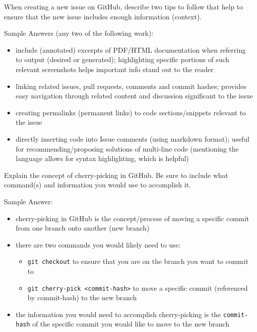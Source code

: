 \documentclass[12pt,fleqn]{examtst}
\begin{document}

\newpage
\noindent
\begin{minipage}{\textwidth}

When creating a new issue on GitHub, describe two tips to follow that help to ensure that the new issue includes enough information (context).


Sample Answers (any two of the following work):
\begin{itemize}
    \item include (annotated) excerpts of PDF/HTML documentation when referring to output (desired or generated); highlighting specific portions of such relevant screenshots helps important info stand out to the reader
    \item linking related issues, pull requests, comments and commit hashes; provides easy navigation through related content and discussion significant to the issue
    \item creating permalinks (permanent links) to code sections/snippets relevant to the issue
    \item directly inserting code into Issue comments (using markdown format); useful for recommending/proposing solutions of multi-line code (mentioning the language allows for syntax highlighting, which is helpful)
\end{itemize}

\rule{0cm}{1cm}

Explain the concept of cherry-picking in GitHub. Be sure to include what command(s) and information you would use to accomplish it.


Sample Answer:
\begin{itemize}
    \item cherry-picking in GitHub is the concept/process of moving a specific commit from one branch onto another (new branch)
    \item there are two commands you would likely need to use:
    \begin{itemize}
        \item \lstinline{git checkout} to ensure that you are on the branch you want to commit to
        \item \lstinline{git cherry-pick <commit-hash>} to move a specific commit (referenced by commit-hash) to the new branch
    \end{itemize}
    \item the information you would need to accomplish cherry-picking is the \lstinline{commit-hash} of the specific commit you would like to move to the new branch
\end{itemize}

\rule{0cm}{1cm}

\end{minipage}
\end{document}
